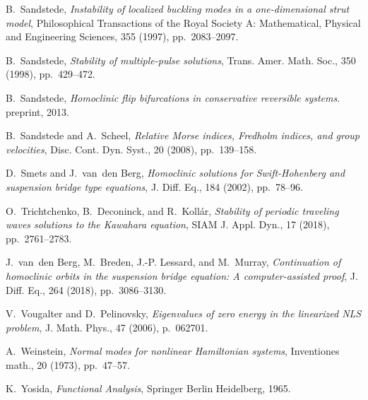 \documentclass[review,onefignum,onetabnum]{siamart171218}
\begin{document}
\begin{thebibliography}{10}
{\sc B.~Sandstede}, {\em Instability of localized buckling modes in a
  one-dimensional strut model}, Philosophical Transactions of the Royal Society
  A: Mathematical, Physical and Engineering Sciences, 355 (1997),
  pp.~2083--2097.

{\sc B.~Sandstede}, {\em Stability of multiple-pulse solutions}, Trans. Amer.
  Math. Soc., 350 (1998), pp.~429--472.

{\sc B.~Sandstede}, {\em Homoclinic flip bifurcations in conservative
  reversible systems}.
\newblock preprint, 2013.

{\sc B.~Sandstede and A.~Scheel}, {\em Relative {M}orse indices, {F}redholm
  indices, and group velocities}, Disc. Cont. Dyn. Syst., 20 (2008),
  pp.~139--158.

{\sc D.~Smets and J.~van~den Berg}, {\em Homoclinic solutions for
  {S}wift-{H}ohenberg and suspension bridge type equations}, J. Diff. Eq., 184
  (2002), pp.~78--96.

{\sc O.~Trichtchenko, B.~Deconinck, and R.~Koll\'ar}, {\em Stability of
  periodic traveling waves solutions to the {K}awahara equation}, SIAM J. Appl.
  Dyn., 17 (2018), pp.~2761--2783.

{\sc J.~van~den Berg, M.~Breden, J.-P. Lessard, and M.~Murray}, {\em
  Continuation of homoclinic orbits in the suspension bridge equation: A
  computer-assisted proof}, J. Diff. Eq., 264 (2018), pp.~3086--3130.

{\sc V.~Vougalter and D.~Pelinovsky}, {\em Eigenvalues of zero energy in the
  linearized {NLS} problem}, J. Math. Phys., 47 (2006), p.~062701.

{\sc A.~Weinstein}, {\em Normal modes for nonlinear {H}amiltonian systems},
  Inventiones math., 20 (1973), pp.~47--57.

{\sc K.~Yosida}, {\em Functional Analysis}, Springer Berlin Heidelberg, 1965.

\end{thebibliography}

\end{document}
